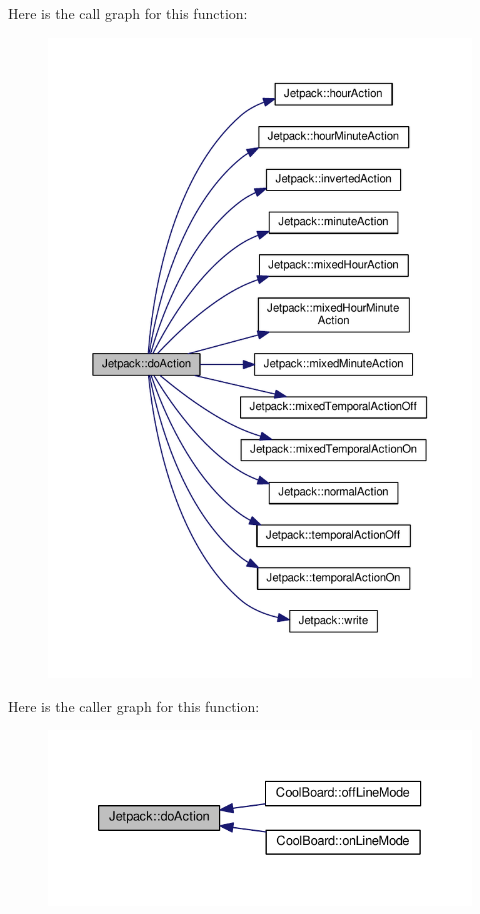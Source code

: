 Here is the call graph for this function\+:
\nopagebreak
\begin{figure}[H]
\begin{center}
\leavevmode
\includegraphics[width=350pt]{df/d1d/class_jetpack_af9acedb606340c26c2636c282b54dff1_cgraph}
\end{center}
\end{figure}
Here is the caller graph for this function\+:
\nopagebreak
\begin{figure}[H]
\begin{center}
\leavevmode
\includegraphics[width=333pt]{df/d1d/class_jetpack_af9acedb606340c26c2636c282b54dff1_icgraph}
\end{center}
\end{figure}
\mbox{\label{class_jetpack_a65ce9533c39fa71e4945b970bf14b980}} 
